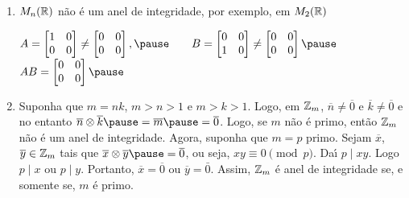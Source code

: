 \documentclass{beamer}
\begin{document}
    \begin{frame}
        \begin{exemplos}
            \begin{enumerate}[label={\arabic*})]
                \conti

                \item $M_{n}(\mathbb{R})$ \pause n{\~a}o {\'e} um anel de integridade, \pause por exemplo, em $M_{2}(\mathbb{R})$\pause
                \begin{center}
                    $A = \begin{bmatrix}
                        1 & 0\\
                        0 & 0
                    \end{bmatrix} \neq \begin{bmatrix}
                        0 & 0\\
                        0 & 0
                    \end{bmatrix},\pause \qquad
                    B = \begin{bmatrix}
                        0 & 0\\
                        1 & 0
                    \end{bmatrix} \neq \begin{bmatrix}
                        0 & 0\\
                        0 & 0
                    \end{bmatrix}\pause$\\
                    $AB  =\begin{bmatrix}
                        0 & 0\\
                        0 & 0
                    \end{bmatrix}\pause$
                \end{center}

                \vspace{.5cm}

                \item Suponha que $m = nk$, \pause $m > n > 1$ \pause e $m > k > 1$. \pause Logo, em $\mathbb{Z}_m$, \pause $\overline{n} \neq \overline{0}$ \pause e $\overline{k} \neq \overline{0}$ \pause e no entanto $\overline{n} \otimes \overline{k} \pause = \overline{m} \pause = \overline{0}$. \pause Logo, se $m$ n{\~a}o {\'e} primo, \pause ent{\~a}o $\mathbb{Z}_m$ n{\~a}o {\'e} um anel de integridade. \pause Agora, suponha que $m = p$ primo. \pause Sejam $\overline{x}$, \pause $\overline{y} \in \mathbb{Z}_m$ \pause tais que $\overline{x}\otimes \overline{y} \pause = \overline{0}$, \pause ou seja, $xy \equiv 0 \pmod p$. \pause Da{\'\i} $p\mid xy$. \pause Logo $p\mid x$ \pause ou $p\mid y$. \pause Portanto, $\overline{x} = \overline{0}$ \pause ou $\overline{y} = \bar{0}$. \pause Assim, $\mathbb{Z}_m$ {\'e} anel de integridade \pause se, e somente se, \pause $m$ {\'e} primo.\pause
            \end{enumerate}
        \end{exemplos}
    \end{frame}
\end{document}
